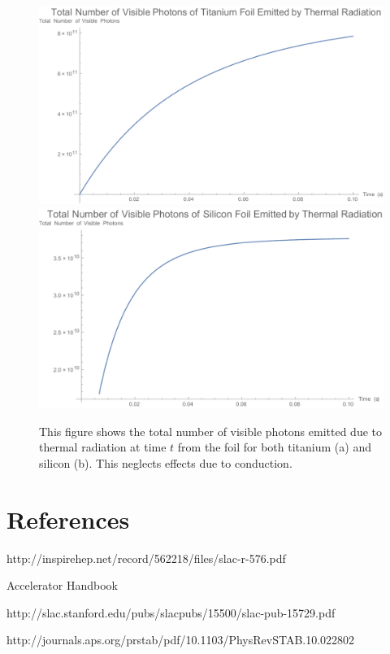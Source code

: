 \documentclass[12pt]{article}
\begin{document}
\begin{figure}
\begin{center}
\includegraphics[scale=0.5]{figures/PhotonsTotalTi.PDF}
\includegraphics[scale=0.5]{figures/PhotonsTotalSi.PDF}
\caption{This figure shows the total number of visible photons emitted due to thermal radiation at time $t$ from the foil for both titanium (a) and silicon (b). This neglects effects due to conduction.}
\end{center}
\end{figure}

\section*{References}
\begin{enumerate}[{[}1{]}]
\item http://inspirehep.net/record/562218/files/slac-r-576.pdf
\item Accelerator Handbook
\item http://slac.stanford.edu/pubs/slacpubs/15500/slac-pub-15729.pdf
\item http://journals.aps.org/prstab/pdf/10.1103/PhysRevSTAB.10.022802

\end{enumerate}
\end{document}
